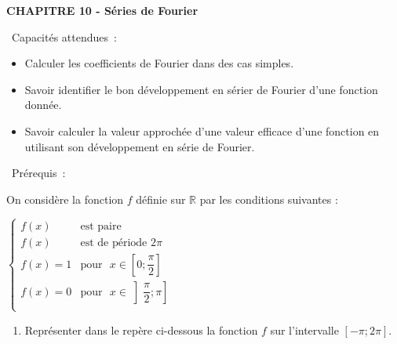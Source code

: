 \documentclass[11pt,a4paper]{article}
\newcommand{\bpre}[1]
{\begin{bclogo}[couleur = white,logo=, barre=none, arrondi = 0.1]
{~Prérequis~:}
~~
{#1}
~~
\end{bclogo}}
\begin{document}
\begin{mybox}
\begin{center}    
\textbf{\LARGE CHAPITRE 10 - Séries de Fourier}\end{center}
\end{mybox}

\vfill


\vspace{0.1cm}
\begin{center}
\begin{minipage}{14cm}

    \begin{bclogo}[couleur = white,  arrondi = 0.1]
{~Capacités attendues~:}
~~
\begin{itemize}
\item Calculer les coefficients de Fourier dans des cas simples.
\item Savoir identifier le bon développement en sérier de Fourier d'une fonction donnée. 
\item Savoir calculer la valeur approchée d'une valeur efficace d'une fonction en utilisant son développement en série de Fourier.

    
\end{itemize}

\end{bclogo}
\end{minipage}
    
\end{center}
  

\bpre{%
On considère la fonction $f$ définie sur $\mathbb{R}$ par les conditions suivantes : \\
\begin{center}
$\begin{cases}
f(x) &\textrm{est paire}\\
f(x)&\textrm {est de période }2\pi \\
f(x)=1  & \textrm {pour~~} x \in \left[0;\dfrac{\pi}{2} \right]\\
f(x)=0  & \textrm {pour~~} x \in \left]\dfrac{\pi}{2};\pi \right]\\
\end{cases}$
\end{center}

\begin{enumerate}
    \item Représenter dans le repère ci-dessous la fonction $f$ sur l'intervalle $[-\pi;2\pi]$.
\end{enumerate}
}
\end{document}
